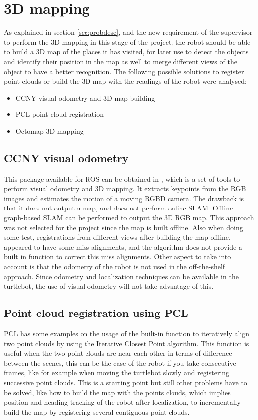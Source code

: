 \documentclass[fontsize=12pt]{article}
\begin{document}
\section{3D mapping}
\label{sec:map}
As explained in section \ref{sec:probdesc}, and the new requirement of the supervisor to perform the 3D mapping in this stage of the project; the robot should be able to build a 3D map of the places it has visited, for later use to detect the objects and identify their position in the map as well to merge different views of the object to have a better recognition. The following possible solutions to register point clouds or build the 3D map with the readings of the robot were analysed:
\begin{itemize}
\item CCNY visual odometry and 3D map building
\item PCL point cloud registration
\item Octomap 3D mapping
\end{itemize}

\subsection{CCNY visual odometry}
This package available for ROS can be obtained in \cite{bib:visualodo}, which is a set of tools to  perform visual odometry and 3D mapping. It extracts keypoints from the RGB images and  estimates the motion of a moving RGBD camera. The drawback is that  it does not output a map, and does not perform online SLAM. Offline graph-based SLAM  can be performed to output the 3D RGB map. This approach was not selected for the project since the map is built offline. Also when doing some test, registrations from different views after building the map offline, appeared to have some miss alignments, and the algorithm does not provide a built in function to correct this miss alignments. Other aspect to take into account is that the odometry of the robot is not used in the off-the-shelf approach. Since odometry and localization techniques can be  available in the turtlebot, the use of visual odometry will not take advantage of this. 

\subsection{Point cloud registration using PCL}
PCL has some examples on the usage of the built-in function to iteratively align two point clouds by using the Iterative Closest Point algorithm. This function is useful when the two point clouds are near each other in terms of difference between the scenes, this can be the case of the robot if you take consecutive frames, like for example when moving the turtlebot slowly and registering successive point clouds. This is a starting point but still other problems have to be solved, like how to build the map with the points clouds, which implies position and heading tracking of the robot after localization, to incrementally build the map by registering several contiguous point clouds. 
\end{document}
